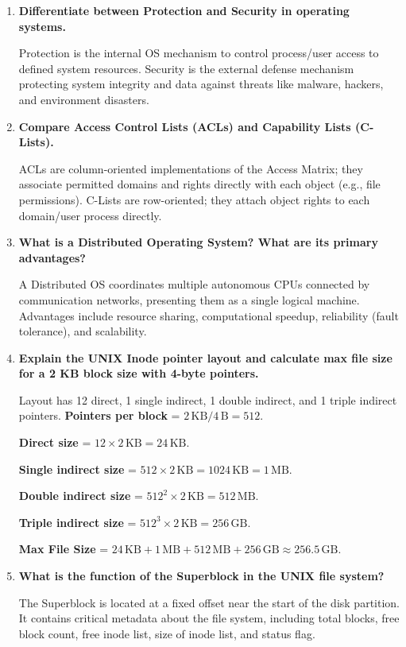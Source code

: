 \documentclass[12pt,a4paper]{article}
\newcommand{\Q}[1]{\textbf{#1}\par\noindent\ignorespaces}
\begin{document}
\begin{tcolorbox}[exambox, title={\textbf{Frequently Asked / Viva Questions}}]
\begin{enumerate}[topsep=0pt, label=\textbf{Q\arabic*.}, itemsep=5pt]
  \item \Q{Differentiate between Protection and Security in operating systems.}
    Protection is the internal OS mechanism to control process/user access to defined system resources. Security is the external defense mechanism protecting system integrity and data against threats like malware, hackers, and environment disasters.
  \item \Q{Compare Access Control Lists (ACLs) and Capability Lists (C-Lists).}
    ACLs are column-oriented implementations of the Access Matrix; they associate permitted domains and rights directly with each object (e.g., file permissions). C-Lists are row-oriented; they attach object rights to each domain/user process directly.
  \item \Q{What is a Distributed Operating System? What are its primary advantages?}
    A Distributed OS coordinates multiple autonomous CPUs connected by communication networks, presenting them as a single logical machine. Advantages include resource sharing, computational speedup, reliability (fault tolerance), and scalability.
  \item \Q{Explain the UNIX Inode pointer layout and calculate max file size for a 2 KB block size with 4-byte pointers.}
    Layout has 12 direct, 1 single indirect, 1 double indirect, and 1 triple indirect pointers.
    \textbf{Pointers per block} = $2\,\text{KB} / 4\,\text{B} = 512$.\par
    \textbf{Direct size} = $12 \times 2\,\text{KB} = 24\,\text{KB}$.\par
    \textbf{Single indirect size} = $512 \times 2\,\text{KB} = 1024\,\text{KB} = 1\,\text{MB}$.\par
    \textbf{Double indirect size} = $512^2 \times 2\,\text{KB} = 512\,\text{MB}$.\par
    \textbf{Triple indirect size} = $512^3 \times 2\,\text{KB} = 256\,\text{GB}$.\par
    \textbf{Max File Size} = $24\,\text{KB} + 1\,\text{MB} + 512\,\text{MB} + 256\,\text{GB} \approx 256.5\,\text{GB}$.
  \item \Q{What is the function of the Superblock in the UNIX file system?}
    The Superblock is located at a fixed offset near the start of the disk partition. It contains critical metadata about the file system, including total blocks, free block count, free inode list, size of inode list, and status flag.

\end{enumerate}
\end{tcolorbox}
\end{document}
